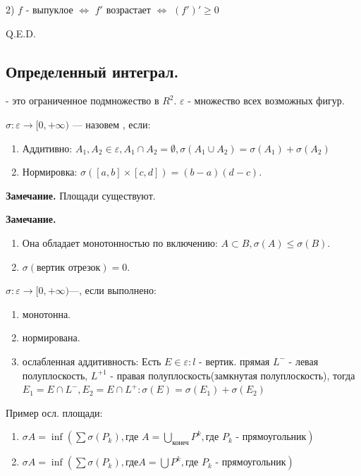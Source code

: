2) $f$ - выпуклое $\Leftrightarrow$ $f'$ возрастает $\Leftrightarrow$ $(f')'\geq 0 $

\hfill Q.E.D.
\pagebreak


\subsection{Определенный интеграл.}


  - это ограниченное подмножество в $R^2$. $\varepsilon$ - множество всех возможных фигур.

$\sigma: \varepsilon \rightarrow [0,+\infty)$ ---  назовем , если:
\begin{enumerate}
    \item Аддитивно: $A_1,A_2 \in \varepsilon, A_1\cap A_2 = \emptyset, \sigma(A_1\cup A_2) = \sigma(A_1)+\sigma(A_2)$
\item Нормировка: $\sigma ([a,b]\times[c,d]) = (b-a)(d-c)$.
\end{enumerate}

\textbf{Замечание.} Площади существуют.

\textbf{Замечание.} \begin{enumerate}
    \item Она обладает монотонностью по включению: $A \subset B, \sigma(A) \leq \sigma(B)$.
    \item $\sigma(\text{вертик отрезок})=0$.
\end{enumerate}

  $\sigma:\varepsilon\rightarrow [0,+\infty)$---, если выполнено:
\begin{enumerate}
    \item монотонна.
    \item нормирована.
    \item ослабленная аддитивность: Есть $E \in \varepsilon: l $ - вертик. прямая $L^-$ - левая полуплоскость, $L^{+1}$ - правая полуплоскость(замкнутая полуплоскость), тогда  $E_1 = E\cap L^-, E_2 = E \cap L^+: \sigma(E)=\sigma(E_1)+\sigma(E_2)$
\end{enumerate}

Пример осл. площади:
\begin{enumerate}
    \item $\sigma A = \inf (\sum \sigma(P_k), \text{где $A = \bigcup\limits_{\text{конеч}}P^k, \text{где $P_k$ - прямоугольник}$})$ 
    \item $\sigma A = \inf (\sum \sigma(P_k), \text{где} A = \bigcup P^k, \text{где $P_k$ - прямоугольник})$
\end{enumerate}

